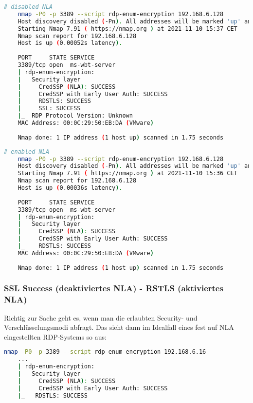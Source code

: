 \begin{lstlisting}[language=bash]
    # disabled NLA
    nmap -P0 -p 3389 --script rdp-enum-encryption 192.168.6.128
    Host discovery disabled (-Pn). All addresses will be marked 'up' and scan times will be slower.
    Starting Nmap 7.91 ( https://nmap.org ) at 2021-11-10 15:37 CET
    Nmap scan report for 192.168.6.128
    Host is up (0.00052s latency).
    
    PORT     STATE SERVICE
    3389/tcp open  ms-wbt-server
    | rdp-enum-encryption:
    |   Security layer
    |     CredSSP (NLA): SUCCESS
    |     CredSSP with Early User Auth: SUCCESS
    |     RDSTLS: SUCCESS
    |     SSL: SUCCESS
    |_  RDP Protocol Version: Unknown
    MAC Address: 00:0C:29:50:EB:DA (VMware)
    
    Nmap done: 1 IP address (1 host up) scanned in 1.75 seconds
\end{lstlisting}

\begin{lstlisting}[language=bash]
    # enabled NLA
    nmap -P0 -p 3389 --script rdp-enum-encryption 192.168.6.128
    Host discovery disabled (-Pn). All addresses will be marked 'up' and scan times will be slower.
    Starting Nmap 7.91 ( https://nmap.org ) at 2021-11-10 15:36 CET
    Nmap scan report for 192.168.6.128
    Host is up (0.00036s latency).
    
    PORT     STATE SERVICE
    3389/tcp open  ms-wbt-server
    | rdp-enum-encryption:
    |   Security layer
    |     CredSSP (NLA): SUCCESS
    |     CredSSP with Early User Auth: SUCCESS
    |_    RDSTLS: SUCCESS
    MAC Address: 00:0C:29:50:EB:DA (VMware)
    
    Nmap done: 1 IP address (1 host up) scanned in 1.75 seconds
\end{lstlisting}

\subsubsection{SSL Success (deaktiviertes NLA) - RSTLS (aktiviertes NLA)}

Richtig zur Sache geht es, wenn man die erlaubten Security- und Verschlüsselungsmodi abfragt. Das sieht dann im Idealfall eines fest auf NLA eingestellten RDP-Systems so aus:

\begin{lstlisting}[language=bash]
    nmap -P0 -p 3389 --script rdp-enum-encryption 192.168.6.16
    ...
    | rdp-enum-encryption:
    |   Security layer
    |     CredSSP (NLA): SUCCESS
    |     CredSSP with Early User Auth: SUCCESS
    |_   RDSTLS: SUCCESS
\end{lstlisting}


